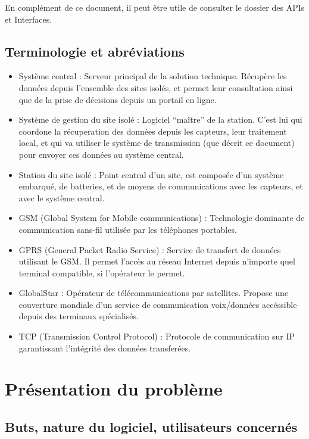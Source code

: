 En complément de ce document, il peut être utile de consulter le dossier des APIs et Interfaces.

\subsection{Terminologie et abréviations}

\begin{itemize}
\item Système central : Serveur principal de la solution technique. Récupère les données depuis l'ensemble des sites isolés, et permet leur consultation ainsi que de la prise de décisions depuis un portail en ligne.
\item Système de gestion du site isolé : Logiciel ``maître'' de la station. C'est lui qui coordone la récuperation des données depuis les capteurs, leur traitement local, et qui va utiliser le système de transmission (que décrit ce document) pour envoyer ces données au système central.
\item Station du site isolé : Point central d'un site, est composée d'un système embarqué, de batteries, et de moyens de communications avec les capteurs, et avec le système central.
\end{itemize}

\begin{itemize}
\item GSM (Global System for Mobile communications) : Technologie dominante de communication sans-fil utilisée par les téléphones portables. 
\item GPRS (General Packet Radio Service) : Service de transfert de données utilisant le GSM. Il permet l'accès au réseau Internet depuis n'importe quel terminal compatible, si l'opérateur le permet.
\item GlobalStar : Opérateur de télécommunications par satellites. Propose une couverture mondiale d'un service de communication voix/données accéssible depuis des terminaux spécialisés.
\item TCP (Transmission Control Protocol) : Protocole de communication sur IP garantissant l'intégrité des données transferées.
\end{itemize}

\section{Présentation du problème}

\subsection{Buts, nature du logiciel, utilisateurs concernés}

